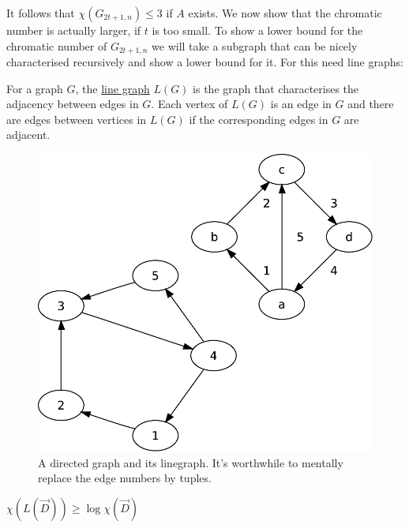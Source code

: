 It follows that $\chi(G_{2t+1,n})\leq 3$ if $A$ exists. We now show that the chromatic number is actually larger, if $t$ is too small. To show a lower bound for the chromatic number of $G_{2t+1,n}$ we will take a subgraph that can be nicely characterised recursively and show a lower bound for it. For this need line graphs:

\begin{Def} For a graph $G$, the \href{http://en.wikipedia.org/wiki/Line_graph}{line graph} $L(G)$ is the graph that characterises the adjacency between edges in $G$. Each vertex of $L(G)$ is an edge in $G$ and there are edges between vertices in $L(G)$ if the corresponding edges in $G$ are adjacent.

\begin{figure}[hbt]
\begin{center}
\includegraphics[width=0.8\linewidth]{./images/linegraph_ex}
\end{center}
\caption{A directed graph and its linegraph. It's worthwhile to mentally replace the edge numbers by tuples.}
\end{figure}
\end{Def}

\begin{lem} \label{lem:chi_line_graphs} $\chi(L(\vec D)) \geq \log \chi(\vec D)$ \end{lem}

